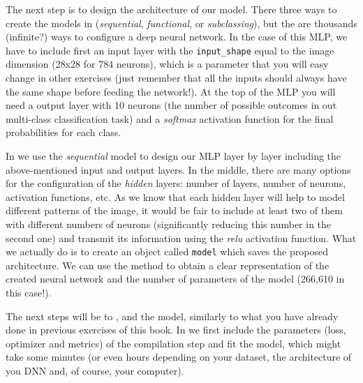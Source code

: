 
The next step is to design the architecture of our model. There three ways to create the models in  (\textit{sequential}, \textit{functional}, or \textit{subclassing}), but the are thousands (infinite?) ways to configure a deep neural network. In the case of this MLP, we have to include first an input layer with the \texttt{input\_shape} equal to the image dimension (28x28 for 784 neurons), which is a parameter that you will easy change in other exercises (just remember that all the inputs should always have the same shape before feeding the network!). At the top of the MLP you will  need a output layer with 10 neurons (the number of possible outcomes in out multi-class classification task) and a \textit{softmax} activation function for the final probabilities for each class.

In  we use the \textit{sequential} model to design our MLP layer by layer including the above-mentioned input and output layers. In the middle, there are many options for the configuration of the \textit{hidden} layers: number of layers, number of neurons, activation functions, etc. As we know that each hidden layer will help to model different patterns of the image, it would be fair to include at least two of them with different numbers of neurons (significantly reducing this number in the second one) and transmit its information using the \textit{relu} activation function. What we actually do is to create an object called \texttt{model} which saves the proposed architecture. We can use the method  to obtain a clear representation of the created neural network and the number of parameters of the model (266,610 in this case!).


The next steps will be to ,  and  the model, similarly to what you have already done in previous exercises of this book. In  we first include the parameters (loss, optimizer and metrics) of the compilation step and fit the model, which might take some minutes (or even hours depending on your dataset, the architecture of you DNN and, of course, your computer). 

